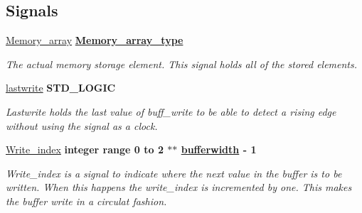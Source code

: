 \subsection*{Signals}
 \begin{DoxyCompactItemize}
\item 
\hypertarget{classADC__buffer_1_1Behavioral_aa3242fe5cbe81a6710bd0ed34005d4ef}{\hyperlink{classADC__buffer_1_1Behavioral_aa3242fe5cbe81a6710bd0ed34005d4ef}{Memory\-\_\-array} {\bfseries {\bfseries \hyperlink{classADC__buffer_1_1Behavioral_a658e2166090ca64ce974029de2840027}{Memory\-\_\-array\-\_\-type}} \textcolor{vhdlchar}{ }} }\label{classADC__buffer_1_1Behavioral_aa3242fe5cbe81a6710bd0ed34005d4ef}

\begin{DoxyCompactList}\small\item\em The actual memory storage element. This signal holds all of the stored elements. \end{DoxyCompactList}\item 
\hypertarget{classADC__buffer_1_1Behavioral_ab722211b6f3f8617f6cf3e17336a0a12}{\hyperlink{classADC__buffer_1_1Behavioral_ab722211b6f3f8617f6cf3e17336a0a12}{lastwrite} {\bfseries \textcolor{comment}{S\-T\-D\-\_\-\-L\-O\-G\-I\-C}\textcolor{vhdlchar}{ }} }\label{classADC__buffer_1_1Behavioral_ab722211b6f3f8617f6cf3e17336a0a12}

\begin{DoxyCompactList}\small\item\em Lastwrite holds the last value of buff\-\_\-write to be able to detect a rising edge without using the signal as a clock. \end{DoxyCompactList}\item 
\hypertarget{classADC__buffer_1_1Behavioral_a8333467b8d5554bb68347610f6060c42}{\hyperlink{classADC__buffer_1_1Behavioral_a8333467b8d5554bb68347610f6060c42}{Write\-\_\-index} {\bfseries \textcolor{comment}{integer}\textcolor{vhdlchar}{ }\textcolor{vhdlkeyword}{range}\textcolor{vhdlchar}{ } \textcolor{vhdldigit}{0} \textcolor{vhdlchar}{ }\textcolor{vhdlchar}{ }\textcolor{vhdlchar}{ }\textcolor{vhdlkeyword}{to}\textcolor{vhdlchar}{ }\textcolor{vhdlchar}{ }\textcolor{vhdlchar}{ } \textcolor{vhdldigit}{2} \textcolor{vhdlchar}{ }\textcolor{vhdlchar}{$\ast$}\textcolor{vhdlchar}{$\ast$}\textcolor{vhdlchar}{ }{\bfseries \hyperlink{classADC__buffer_a2f94b7b31a8914ee23be5e000f89e921}{bufferwidth}} \textcolor{vhdlchar}{ }\textcolor{vhdlchar}{-\/}\textcolor{vhdlchar}{ } \textcolor{vhdldigit}{1} \textcolor{vhdlchar}{ }} }\label{classADC__buffer_1_1Behavioral_a8333467b8d5554bb68347610f6060c42}

\begin{DoxyCompactList}\small\item\em Write\-\_\-index is a signal to indicate where the next value in the buffer is to be written. When this happens the write\-\_\-index is incremented by one. This makes the buffer write in a circulat fashion. \end{DoxyCompactList}\end{DoxyCompactItemize}


